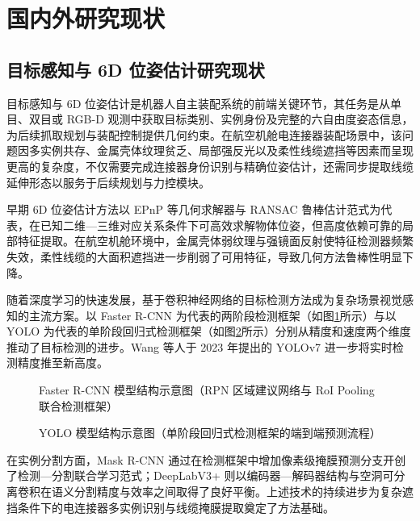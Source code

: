 \section{国内外研究现状}

\subsection{目标感知与 6D 位姿估计研究现状}

目标感知与 6D 位姿估计是机器人自主装配系统的前端关键环节，其任务是从单目、双目或 RGB-D 观测中获取目标类别、实例身份及完整的六自由度姿态信息，为后续抓取规划与装配控制提供几何约束。在航空机舱电连接器装配场景中，该问题因多实例共存、金属壳体纹理贫乏、局部强反光以及柔性线缆遮挡等因素而呈现更高的复杂度，不仅需要完成连接器身份识别与精确位姿估计，还需同步提取线缆延伸形态以服务于后续规划与力控模块。

早期 6D 位姿估计方法以 EPnP\cite{Lepetit2009} 等几何求解器与 RANSAC 鲁棒估计范式为代表，在已知二维—三维对应关系条件下可高效求解物体位姿，但高度依赖可靠的局部特征提取。在航空机舱环境中，金属壳体弱纹理与强镜面反射使特征检测器频繁失效，柔性线缆的大面积遮挡进一步削弱了可用特征，导致几何方法鲁棒性明显下降。

随着深度学习的快速发展，基于卷积神经网络的目标检测方法成为复杂场景视觉感知的主流方案。以 Faster R-CNN\cite{Ren2015} 为代表的两阶段检测框架（如图\ref{fig:ch1:faster-rcnn}所示）与以 YOLO\cite{Redmon2016} 为代表的单阶段回归式检测框架（如图\ref{fig:ch1:yolo}所示）分别从精度和速度两个维度推动了目标检测的进步。Wang 等人于 2023 年提出的 YOLOv7\cite{Wang2023yolov7} 进一步将实时检测精度推至新高度。

\begin{figure}[htbp]
  \centering
  \caption{Faster R-CNN 模型结构示意图（RPN 区域建议网络与 RoI Pooling 联合检测框架）}
  \label{fig:ch1:faster-rcnn}
\end{figure}

\begin{figure}[htbp]
  \centering
  \caption{YOLO 模型结构示意图（单阶段回归式检测框架的端到端预测流程）}
  \label{fig:ch1:yolo}
\end{figure}

在实例分割方面，Mask R-CNN\cite{He2017maskrcnn} 通过在检测框架中增加像素级掩膜预测分支开创了检测—分割联合学习范式；DeepLabV3+\cite{Chen2018deeplabv3plus} 则以编码器—解码器结构与空洞可分离卷积在语义分割精度与效率之间取得了良好平衡。上述技术的持续进步为复杂遮挡条件下的电连接器多实例识别与线缆掩膜提取奠定了方法基础。

